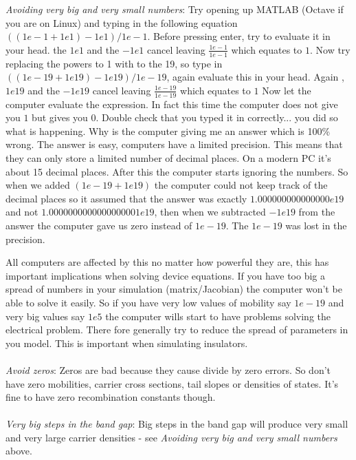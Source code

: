 \emph{Avoiding very big and very small numbers}: Try opening up MATLAB (Octave if you are on Linux) and typing in the following equation $((1e-1+1e1)-1e1)/1e-1$. Before pressing enter, try to evaluate it in your head. the $1e1$ and the $-1e1$ cancel leaving $\frac{1e-1}{1e-1}$ which equates to $1$.  Now try replacing the powers to 1 with to the 19, so type in $((1e-19+1e19)-1e19)/1e-19$, again evaluate this in your head.  Again , $1e19$ and the $-1e19$ cancel leaving $\frac{1e-19}{1e-19}$ which equates to $1$  Now let the computer evaluate the expression.  In fact this time the computer does not give you $1$ but gives you $0$. Double check that you typed it in correctly... you did so what is happening. Why is the computer giving me an answer which is 100\% wrong.  The answer is easy, computers have a limited precision. This means that they can only store a limited number of decimal places. On a modern PC it's about 15 decimal places. After this the computer starts ignoring the numbers.  So when we added $(1e-19+1e19)$ the computer could not keep track of the decimal places so it assumed that the answer was exactly $1.000000000000000e19$ and not $1.0000000000000000001e19$, then when we subtracted $-1e19$ from the answer the computer gave us zero instead of $1e-19$.  The $1e-19$ was lost in the precision.

All computers are affected by this no matter how powerful they are, this has important implications when solving device equations.  If you have too big a spread of numbers in your simulation (matrix/Jacobian) the computer won't be able to solve it easily.  So if you have very low values of mobility say $1e-19$ and very big values say $1e5$ the computer wills start to have problems solving the electrical problem. There fore generally try to reduce the spread of parameters in you model. This is important when simulating insulators.
\\
\\
\emph{Avoid zeros}: Zeros are bad because they cause divide by zero errors. So don't have zero mobilities, carrier cross sections, tail slopes or densities of states.  It's fine to have zero recombination constants though.
\\
\\
\emph{Very big steps in the band gap}: Big steps in the band gap will produce very small and very large carrier densities - see \emph{Avoiding very big and very small numbers} above.
\\
